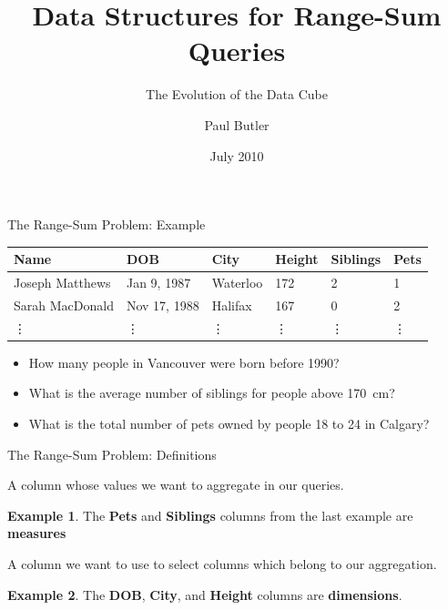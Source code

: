 \documentclass{beamer}
\title{Data Structures for Range-Sum Queries}
\subtitle{The Evolution of the Data Cube}
\author{Paul Butler}
\institute{
    CUMC 2010\\
    Waterloo, Ontario
}
\date{July 2010}
\theoremstyle{definition}
\newtheorem{myexample}{Example}
\theoremstyle{definition}
\begin{document}
\begin{frame}[plain]
    \titlepage
\end{frame}

\begin{frame}{The Range-Sum Problem: Example}
    \begin{table}[h]\footnotesize
        \begin{tabular}{ | l | l | l | l | l | l |}
        \hline
        \rowcolor{red!20!green!20!blue!20}
        \textbf{Name} & \textbf{DOB} & \textbf{City} & \textbf{Height} & \textbf{Siblings} & \textbf{Pets} \\ \hline
        Joseph Matthews & Jan 9, 1987 & Waterloo & 172 & 2 &  1 \\ \hline
        Sarah MacDonald & Nov 17, 1988 & Halifax & 167 & 0 & 2 \\ \hline
        \vdots & \vdots & \vdots & \vdots & \vdots & \vdots \\ \hline
        \end{tabular}
    \end{table}

    \begin{itemize}
        \item<+-> How many people in Vancouver were born before 1990?
        \item<+-> What is the average number of siblings for people above 170~cm?
        \item<+-> What is the total number of pets owned by people 18 to 24 in Calgary?
    \end{itemize}
\end{frame}

\begin{frame}{The Range-Sum Problem: Definitions}
    \begin{definition}[Measure]
        A column whose values we want to aggregate in our queries.
    \end{definition}
    \pause
    \begin{myexample}
        The \textbf{Pets} and \textbf{Siblings} columns from the last example are \textbf{measures}
    \end{myexample}
    \pause
    \begin{definition}[Dimension]
        A column we want to use to select columns which belong to our aggregation.
    \end{definition}
    \pause
    \begin{myexample}
        The \textbf{DOB}, \textbf{City}, and \textbf{Height} columns are \textbf{dimensions}.
    \end{myexample}
\end{frame}
\end{document}
